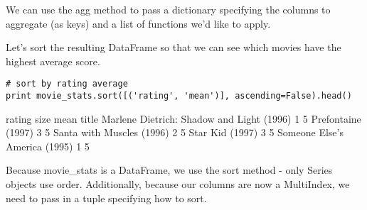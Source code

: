 \documentclass[11pt]{article} %
\begin{document}
We can use the agg method to pass a dictionary specifying the columns to aggregate (as keys) and a list of functions we'd like to apply.

Let's sort the resulting DataFrame so that we can see which movies have the highest average score.

\begin{framed}
\begin{verbatim}
# sort by rating average
print movie_stats.sort([('rating', 'mean')], ascending=False).head()
\end{verbatim}
\end{framed}


                                            rating      
                                              size  mean
title                                                   
Marlene Dietrich: Shadow and Light (1996)        1     5
Prefontaine (1997)                               3     5
Santa with Muscles (1996)                        2     5
Star Kid (1997)                                  3     5
Someone Else's America (1995)                    1     5

Because movie_stats is a DataFrame, we use the sort method - only Series objects use order. Additionally, because our columns are now a MultiIndex, we need to pass in a tuple specifying how to sort.

\end{document}
